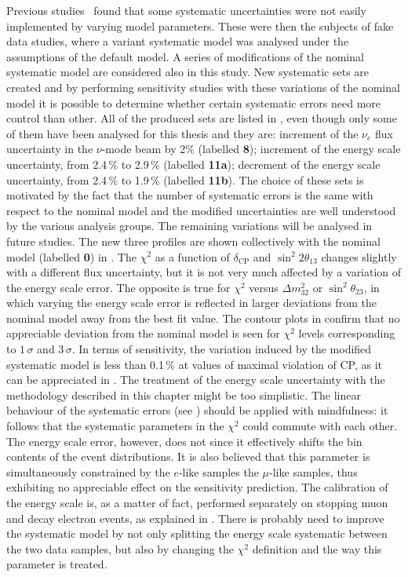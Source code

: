 Previous studies~\cite{Abe:2018wpn} found that some systematic uncertainties %
were not easily implemented by varying model parameters.
These were then the subjects of fake data studies, where a variant systematic model was analysed under %
the assumptions of the default model.
A series of modifications of the nominal systematic model are considered also in this study.
New systematic sets are created and by performing sensitivity studies with these variations of the nominal model %
it is possible to determine whether certain systematic errors need more control than other.
All of the produced sets are listed in , even though only %
some of them have been analysed for this thesis and they are:
increment of the $\nu_e$ flux uncertainty in the $\nu$-mode beam by 2\% (labelled \textbf{8}); %
increment of the energy scale uncertainty, from 2.4\,\% to 2.9\,\% (labelled \textbf{11a}); %
decrement of the energy scale uncertainty, from 2.4\,\% to 1.9\,\% (labelled \textbf{11b}).
The choice of these sets is motivated by the fact that the number of systematic errors is the same %
with respect to the nominal model and the modified uncertainties are well understood by the various analysis groups.
The remaining variations will be analysed in future studies.
The new three profiles are shown collectively with the nominal model (labelled \textbf{0}) in .
The $\chi^2$ as a function of $\delta_\text{CP}$ and $\sin^2 2\theta_{13}$ changes slightly with a different flux uncertainty, %
but it is not very much affected by a variation of the energy scale error.
The opposite is true for $\chi^2$ versus $\Delta m_{32}^2$ or $\sin^2\theta_{23}$, in which %
varying the energy scale error is reflected in larger deviations from the nominal model away from the best fit value.
The contour plots in  confirm that no appreciable deviation from the nominal model %
is seen for $\chi^2$ levels corresponding to $1\,\sigma$ and $3\,\sigma$.
In terms of sensitivity, the variation induced by the modified systematic model is %
less than 0.1\,\% at values of maximal violation of CP, as it can be appreciated in .
The treatment of the energy scale uncertainty with the methodology described in this chapter might be too simplistic.
The linear behaviour of the systematic errors (see ) should be applied with mindfulness: %
it follows that the systematic parameters in the $\chi^2$ could commute with each other.
The energy scale error, however, does not since it effectively shifts the bin contents of the event distributions.
It is also believed that this parameter is simultaneously constrained by the $e$-like samples %
the $\mu$-like samples, thus exhibiting no appreciable effect on the sensitivity prediction.
The calibration of the energy scale is, as a matter of fact, performed separately %
on stopping muon and decay electron events, as explained in .
There is probably need to improve the systematic model by not only splitting the energy scale systematic %
between the two data samples, but also by changing the $\chi^2$ definition and the way this parameter is treated.

